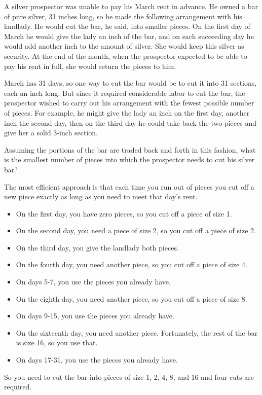\documentclass[fleqn,addpoints]{exam}
\begin{document}
\begin{questions}

\question
A silver prospector was unable to pay his March rent in advance.  He owned a bar of pure silver, 31 inches long, so he
made the following arrangement with his landlady.  He would cut the bar, he said, into smaller pieces.  On the first day
of March he would give the lady an inch of the bar, and on each succeeding day he would add another inch to the amount
of silver.  She would keep this silver as security.  At the end of the month, when the prospector expected to be able to
pay his rent in full, she would return the pieces to him.

March has 31 days, so one way to cut the bar would be to cut it into 31 sections, each an inch long.  But since it
required considerable labor to cut the bar, the prospector wished to carry out his arrangement with the fewest possible
number of pieces.  For example, he might give the lady an inch on the first day, another inch the second day, then on
the third day he could take back the two pieces and give her a solid 3-inch section.

Assuming the portions of the bar are traded back and forth in this fashion, what is the smallest number of pieces into
which the prospector needs to cut his silver bar?

\begin{solution}

The most efficient approach is that each time you run out of pieces you cut off a new piece exactly as long as you need
to meet that day's rent.  

\begin{itemize}
  \item On the first day, you have zero pieces, so you cut off a piece of size 1.  
  \item On the second day, you need a piece of size 2, so you cut off a piece of size 2.
  \item On the third day, you give the landlady both pieces.
  \item On the fourth day, you need another piece, so you cut off a piece of size 4.
  \item On days 5-7, you use the pieces you already have.
  \item On the eighth day, you need another piece, so you cut off a piece of size 8.
  \item On days 9-15, you use the pieces you already have.
  \item On the sixteenth day, you need another piece.  Fortunately, the rest of the bar is size 16, so you use that.
  \item On days 17-31, you use the pieces you already have.
\end{itemize}

So you need to cut the bar into pieces of size 1, 2, 4, 8, and 16 and four cuts are required.

\end{solution}

\end{questions}
\end{document}
